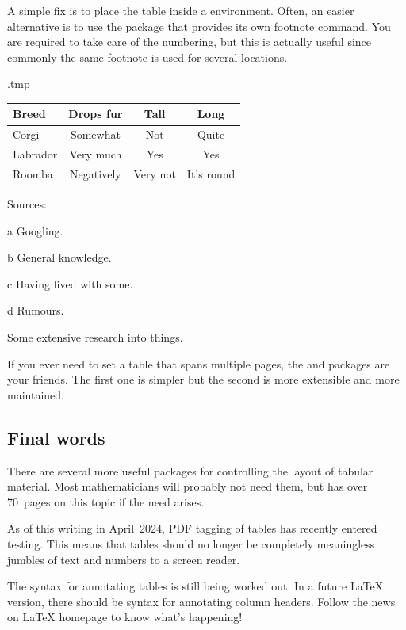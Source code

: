 A simple fix is to place the table inside a  environment.
Often, an easier alternative is to use the  package
that provides its own footnote command.
You are required to take care of the numbering,
but this is actually useful since commonly the same footnote is used for several locations.
%
\begin{VerbatimOut}{\jobname.tmp}
\centering
\begin{threeparttable}
\begin{tabular}{l|ccc}
  Breed & Drops fur & Tall & Long\\
  \hline
  Corgi & Somewhat\tnote{a} & Not\tnote{b} & Quite\tnote{b}\\
  Labrador & Very much\tnote{c} & Yes\tnote{b,c} & Yes\tnote{b,c}\\
  Roomba & Negatively\tnote{d} & Very not\tnote{b} & It's round\tnote{b}
\end{tabular}
\begin{tablenotes}[para]
  \item[] Sources:
  \item[a] Googling.
  \item[b] General knowledge.
  \item[c] Having lived with some.
  \item[d] Rumours.
\end{tablenotes}
\caption{Some extensive research into things.}
\end{threeparttable}
\end{VerbatimOut}
\ShowExampleBelow


If you ever need to set a table that spans multiple pages,
the  and  packages are your friends.
The first one is simpler but the second is more extensible and more maintained.



%
%
\subsection{Final words}

There are several more useful packages for controlling the layout of tabular material.
Most mathematicians will probably not need them,
but \cite{TLC} has over 70~pages on this topic if the need arises.

\begin{latexthree}
As of this writing in April~2024,
PDF tagging of tables has recently entered testing.
This means that tables should no longer be completely meaningless jumbles of text and numbers
to a screen reader.

The syntax for annotating tables is still being worked out.
In a future \LaTeX{} version, there should be syntax for annotating column headers.
Follow the news on \LaTeX{} homepage to know what's happening!
\end{latexthree}
